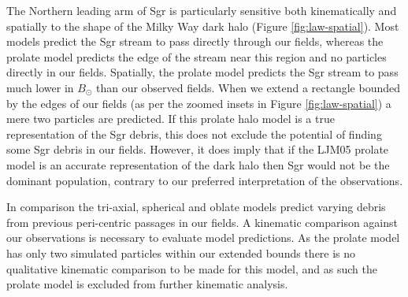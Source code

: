 \documentclass[preprint2]{aastex}
\begin{document}
	The Northern leading arm of Sgr is particularly sensitive both kinematically and spatially to the shape of the Milky Way dark halo (Figure \ref{fig:law-spatial}). Most models predict the Sgr stream to pass directly through our fields, whereas the prolate model predicts the edge of the stream near this region and no particles directly in our fields. Spatially, the prolate model predicts the Sgr stream to pass much lower in $B_\odot$ than our observed fields. When we extend a rectangle bounded by the edges of our fields (as per the zoomed insets in Figure \ref{fig:law-spatial}) a mere two particles are predicted. If this prolate halo model is a true representation of the Sgr debris, this does not exclude the potential of finding some Sgr debris in our fields. However, it does imply that if the LJM05 prolate model is an accurate representation of the dark halo then Sgr would not be the dominant population, contrary to our preferred interpretation of the observations.
	
	In comparison the tri-axial, spherical and oblate models predict varying debris from previous peri-centric passages in our fields. A kinematic comparison against our observations is necessary to evaluate model predictions. As the prolate model has only two simulated particles within our extended bounds there is no qualitative kinematic comparison to be made for this model, and as such the prolate model is excluded from further kinematic analysis.
\end{document}
